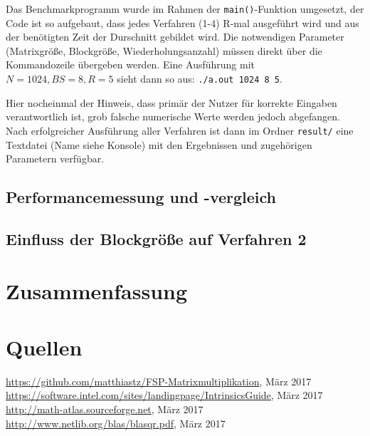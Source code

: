 \documentclass[a4paper,11pt]{scrartcl}
\begin{document}
Das Benchmarkprogramm wurde im Rahmen der \texttt{main()}-Funktion umgesetzt,
der Code ist so aufgebaut, dass jedes Verfahren (1-4) R-mal ausgeführt wird
und aus der benötigten Zeit der Durschnitt gebildet wird. Die notwendigen Parameter
(Matrixgröße, Blockgröße, Wiederholungsanzahl) müssen direkt über die Kommandozeile übergeben werden.
Eine Ausführung mit $N = 1024, BS = 8, R = 5$ sieht dann so aus: \texttt{./a.out 1024 8 5}.
\newline

Hier nocheinmal der Hinweis, dass primär der Nutzer für korrekte Eingaben verantwortlich ist, 
grob falsche numerische Werte werden jedoch abgefangen.
Nach erfolgreicher Ausführung aller Verfahren ist dann im Ordner \texttt{result/} eine Textdatei (Name
siehe Konsole) mit den Ergebnissen und zugehörigen Parametern verfügbar.







\subsection{Performancemessung und -vergleich}

\subsection{Einfluss der Blockgröße auf Verfahren 2}



\section{Zusammenfassung}

\section{Quellen}
\begin{thebibliography}{9}

 \url{https://github.com/matthiastz/FSP-Matrixmultiplikation}, März 2017
 \url{https://software.intel.com/sites/landingpage/IntrinsicsGuide}, März 2017
 \url{http://math-atlas.sourceforge.net}, März 2017
 \url{http://www.netlib.org/blas/blasqr.pdf}, März 2017

\end{thebibliography}
\end{document}
